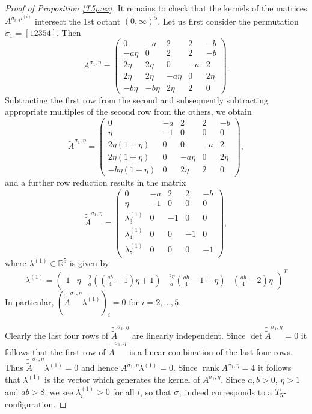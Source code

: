 \documentclass[titlepage]{amsart}
\numberwithin{equation}{section}
\theoremstyle{plain}
\theoremstyle{definition}
\theoremstyle{remark}
\newcommand{\R}{\mathbb{R}}
\newcommand{\rank}{\operatorname{rank}}
\begin{document}
\begin{proof}[Proof of Proposition \ref{T5p:ex}]
It remains to check that the kernels of the matrices $A^{\sigma_i,\mu^{(i)}}$ intersect the 1st octant $(0,\infty)^5$.
 Let us first consider the permutation $\sigma_1=[1 2 3 5 4]$. Then 
$$
A^{\sigma_1,\eta}=\begin{pmatrix}
	0&-a&2&2&-b\\ -a\eta &0&2&2&-b \\ 2\eta &2\eta &0&-a&2\\ 2\eta &2\eta &-a\eta &0&2\eta\\-b\eta &-b\eta &2\eta &2 &0
\end{pmatrix}.	
$$ 
Subtracting the first row from the second and subsequently subtracting appropriate multiples of the second row from the others, we obtain
$$
\tilde A^{\sigma_1,\eta}=\begin{pmatrix}
	0&-a&2&2&-b\\ 
	\eta &-1&0&0&0\\ 
	2\eta(1+\eta) &0&0&-a&2\\ 
	2\eta(1+\eta) &0&-a\eta &0&2\eta\\
	-b\eta(1+\eta) &0 &2\eta &2 &0
\end{pmatrix},
$$ 
and a further row reduction results in the matrix
$$
  \tilde{ \tilde A}^{\sigma_1, \eta}  = \begin{pmatrix}
	0&-a&2&2&-b\\ 
	\eta &-1&0&0&0\\ 
	\lambda^{(1)}_3 &0&-1&0&0\\ 
	\lambda^{(1)}_4 &0&0&-1&0\\
	\lambda^{(1)}_5 &0 &0&0&-1
\end{pmatrix},
$$ 
where $\lambda^{(1)}\in \R^5$ is given by
$$
\lambda^{(1)}=\begin{pmatrix}1&\eta &\tfrac{2}{a}\left((\tfrac{ab}{4}-1)\eta+1\right)&\tfrac{2\eta}{a}\left(\tfrac{ab}{4}-1+\eta\right)&\left(\frac{ab}{4}-2\right)\eta\end{pmatrix}^T
$$ 
In particular, $( \tilde {\tilde A}^{\sigma_1,\eta}\lambda^{(1)})_i=0$ for $i=2,\dots,5$.

Clearly the last four rows of $\tilde {\tilde A}^{\sigma_1,\eta}$
are linearly independent. Since $\det \tilde {\tilde A}^{\sigma_1,\eta} = 0$
it follows that the first row of $\tilde {\tilde A}^{\sigma_1,\eta}$ is a linear combination
of the last four rows. Thus $\tilde {\tilde A}^{\sigma_1,\eta} \lambda^{(1)} = 0$
and hence $A^{\sigma_1, \eta} \lambda^{(1)} = 0$. Since $\rank A^{\sigma_1, \eta} = 4$ it follows that $\lambda^{(1)}$ is the vector which generates the kernel of 
$ A^{\sigma_1, \eta} $. 
Since $a,b>0$, $\eta>1$ and $ab>8$, we see $\lambda^{(1)}_i>0$ for all $i$, so that $\sigma_1$ indeed corresponds to a $T_5$-configuration.



\end{proof}
\end{document}
